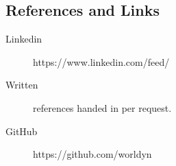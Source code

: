 \documentclass[margin,line,a4paper]{resume}
\begin{document}
\begin{resume}
\section{\mysidestyle References and Links}
\begin{description}
    \item[Linkedin] https://www.linkedin.com/feed/
    \item[Written] references handed in per request.
    \item[GitHub] https://github.com/worldyn
\end{description}

\end{resume}
\end{document}
